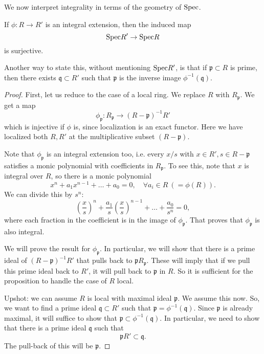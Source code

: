 We now interpret integrality in terms of the geometry of $\mathrm{Spec}$. 

\begin{proposition}
If $\phi: R \to R'$ is an integral extension, then the induced map
\[ \mathrm{Spec} R' \to \mathrm{Spec} R  \]
is surjective.
\end{proposition} 

Another way to state this, without mentioning $\mathrm{Spec} R'$, is that if
$\mathfrak{p} \subset R$ is prime, then there exists $\mathfrak{q} \subset R'$
such that $\mathfrak{p}$ is the inverse image $\phi^{-1}(\mathfrak{q})$.

\begin{proof} 
First, let us reduce to the case of a local ring. 
We replace $R$ with $R_{\mathfrak{p}}$.  We get a map
\[ \phi_{\mathfrak{p}}: R_{\mathfrak{p}} \to (R- \mathfrak{p})^{-1} R'  \]
which is injective if $\phi$ is, since localization is an exact functor. Here we
have localized both $R, R'$ at the multiplicative subset $(R - \mathfrak{p})$.

Note that $\phi_{\mathfrak{p}}$ is an integral extension too, i.e. every $x/s$
with $x \in R', s \in R - \mathfrak{p}$ satisfies a monic polynomial with
coefficients in $R_{\mathfrak{p}}$. To see this, note that $x$ is integral over
$R$, so there is a monic polynomial
\[ x^n + a_1 x^{n-1} + \dots + a_0 = 0, \quad \forall a_i \in R \ (=\phi(R)).  \]
We can divide this by $s^n$:
\[ (\frac{x}{s})^n  + \frac{a_1}{s} (\frac{x}{s})^{n-1} + \dots +
\frac{a_0}{s^n} = 0,  \]
where each fraction in the coefficient is in the image of $\phi_{\mathfrak{p}}$.
That proves that $\phi_{\mathfrak{p}}$ is also integral.

We will prove the result for $\phi_{\mathfrak{p}}$.  In particular, we will show
that there is a prime ideal of $(R- \mathfrak{p})^{-1} R'$ that pulls back to
$\mathfrak{p}R_{\mathfrak{p}}$. These will imply that if we pull this prime
ideal back to $R'$, it will pull back to $\mathfrak{p}$ in $R$.
So it is sufficient for the proposition to handle the case of $R$ local.  

Upshot: we can assume $R$ is local with maximal ideal $\mathfrak{p}$. We assume
this now.
So, we want to find a prime ideal $\mathfrak{q} \subset R'$ such that
$\mathfrak{p}  = \phi^{-1}(\mathfrak{q})$. Since $\mathfrak{p}$ is already
maximal, it will suffice to show that $\mathfrak{p} \subset
\phi^{-1}(\mathfrak{q})$. In particular, we need to show that there is a prime
ideal $\mathfrak{q}$ such that
\[ \mathfrak{p} R' \subset \mathfrak{q}.  \]
The pull-back of this will be $\mathfrak{p}$. 


\end{proof}
